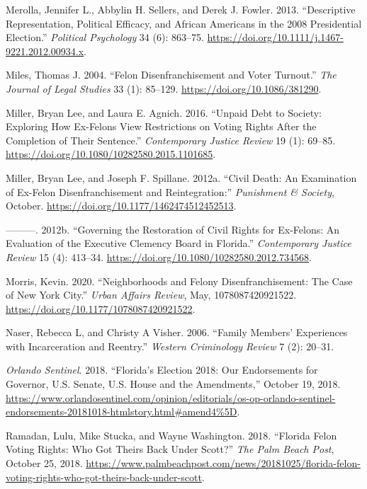 \documentclass[
  12pt,
]{article}
\newlength{\cslhangindent}
\newenvironment{cslreferences}%
  {\setlength{\parindent}{0pt}%
  \everypar{\setlength{\hangindent}{\cslhangindent}}\ignorespaces}%
  {\par}
\begin{document}
\begin{cslreferences}
\leavevmode\hypertarget{ref-Merolla2013}{}%
Merolla, Jennifer L., Abbylin H. Sellers, and Derek J. Fowler. 2013. ``Descriptive Representation, Political Efficacy, and African Americans in the 2008 Presidential Election.'' \emph{Political Psychology} 34 (6): 863--75. \url{https://doi.org/10.1111/j.1467-9221.2012.00934.x}.

\leavevmode\hypertarget{ref-Miles2004}{}%
Miles, Thomas J. 2004. ``Felon Disenfranchisement and Voter Turnout.'' \emph{The Journal of Legal Studies} 33 (1): 85--129. \url{https://doi.org/10.1086/381290}.

\leavevmode\hypertarget{ref-Miller2016}{}%
Miller, Bryan Lee, and Laura E. Agnich. 2016. ``Unpaid Debt to Society: Exploring How Ex-Felons View Restrictions on Voting Rights After the Completion of Their Sentence.'' \emph{Contemporary Justice Review} 19 (1): 69--85. \url{https://doi.org/10.1080/10282580.2015.1101685}.

\leavevmode\hypertarget{ref-Miller2012}{}%
Miller, Bryan Lee, and Joseph F. Spillane. 2012a. ``Civil Death: An Examination of Ex-Felon Disenfranchisement and Reintegration:'' \emph{Punishment \& Society}, October. \url{https://doi.org/10.1177/1462474512452513}.

\leavevmode\hypertarget{ref-Miller2012a}{}%
---------. 2012b. ``Governing the Restoration of Civil Rights for Ex-Felons: An Evaluation of the Executive Clemency Board in Florida.'' \emph{Contemporary Justice Review} 15 (4): 413--34. \url{https://doi.org/10.1080/10282580.2012.734568}.

\leavevmode\hypertarget{ref-Morris2020}{}%
Morris, Kevin. 2020. ``Neighborhoods and Felony Disenfranchisement: The Case of New York City.'' \emph{Urban Affairs Review}, May, 1078087420921522. \url{https://doi.org/10.1177/1078087420921522}.

\leavevmode\hypertarget{ref-Naser2006}{}%
Naser, Rebecca L, and Christy A Visher. 2006. ``Family Members' Experiences with Incarceration and Reentry.'' \emph{Western Criminology Review} 7 (2): 20--31.

\leavevmode\hypertarget{ref-ORLANDOSENTINEL2018}{}%
\emph{Orlando Sentinel}. 2018. ``Florida's Election 2018: Our Endorsements for Governor, U.S. Senate, U.S. House and the Amendments,'' October 19, 2018. \url{https://www.orlandosentinel.com/opinion/editorials/os-op-orlando-sentinel-endorsements-20181018-htmlstory.html\#amend4\%5D}.

\leavevmode\hypertarget{ref-Ramadan2018}{}%
Ramadan, Lulu, Mike Stucka, and Wayne Washington. 2018. ``Florida Felon Voting Rights: Who Got Theirs Back Under Scott?'' \emph{The Palm Beach Post}, October 25, 2018. \url{https://www.palmbeachpost.com/news/20181025/florida-felon-voting-rights-who-got-theirs-back-under-scott}.


\end{cslreferences}
\end{document}

